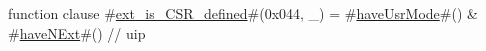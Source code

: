 function clause #\hyperref[sailRISCVzextzyiszyCSRzydefined]{ext\_is\_CSR\_defined}#(0x044, _) = #\hyperref[sailRISCVzhaveUsrMode]{haveUsrMode}#() & #\hyperref[sailRISCVzhaveNExt]{haveNExt}#() // uip
